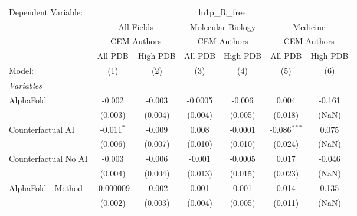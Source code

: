 \begingroup
\centering
\begin{tabular}{lcccccc}
   \tabularnewline \midrule \midrule
   Dependent Variable: & \multicolumn{6}{c}{ln1p\_R\_free}\\
 & \multicolumn{2}{c}{All Fields} & \multicolumn{2}{c}{Molecular Biology} & \multicolumn{2}{c}{Medicine} \\
\cmidrule(lr){2-3} \cmidrule(lr){4-5} \cmidrule(lr){6-7}
 & \multicolumn{2}{c}{CEM Authors} & \multicolumn{2}{c}{CEM Authors} & \multicolumn{2}{c}{CEM Authors} \\
\cmidrule(lr){2-3} \cmidrule(lr){4-5} \cmidrule(lr){6-7}
 & \multicolumn{1}{c}{All PDB} & \multicolumn{1}{c}{High PDB} & \multicolumn{1}{c}{All PDB} & \multicolumn{1}{c}{High PDB} & \multicolumn{1}{c}{All PDB} & \multicolumn{1}{c}{High PDB} \\
\cmidrule(lr){2-2} \cmidrule(lr){3-3} \cmidrule(lr){4-4} \cmidrule(lr){5-5} \cmidrule(lr){6-6} \cmidrule(lr){7-7}
   Model:                                                     & (1)          & (2)          & (3)          & (4)     & (5)            & (6)\\  
   \midrule
   \emph{Variables}\\
   AlphaFold                                                  & -0.002       & -0.003       & -0.0005      & -0.006  & 0.004          & -0.161\\   
                                                              & (0.003)      & (0.004)      & (0.004)      & (0.005) & (0.018)        & (NaN)\\   
   Counterfactual AI                                          & -0.011$^{*}$ & -0.009       & 0.008        & -0.0001 & -0.086$^{***}$ & 0.075\\   
                                                              & (0.006)      & (0.007)      & (0.010)      & (0.010) & (0.024)        & (NaN)\\   
   Counterfactual No AI                                       & -0.003       & -0.006       & -0.001       & -0.0005 & 0.017          & -0.046\\   
                                                              & (0.004)      & (0.004)      & (0.013)      & (0.015) & (0.023)        & (NaN)\\   
   AlphaFold - Method                                         & -0.000009    & -0.002       & 0.001        & 0.001   & 0.014          & 0.135\\   
                                                              & (0.002)      & (0.003)      & (0.004)      & (0.005) & (0.011)        & (NaN)\\   

\end{tabular}
